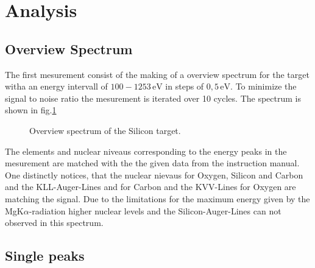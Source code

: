 \documentclass[numbers=noenddot,a4paper]{article}
\begin{document}
	\clearpage
	\section{Analysis}
	
	\subsection{Overview Spectrum}

The first mesurement consist of the making of a overview spectrum for the target witha an energy intervall of $100 - 1253\,\mathrm{eV}$ in steps of $0,5\,\mathrm{eV}$. To minimize the signal to noise ratio the mesurement is iterated over 10 cycles. The spectrum is shown in fig.\ref{fig:all}

				\begin{figure}[h]
					\centering
					\caption{Overview spectrum of the Silicon target.}\label{fig:all}
				\end{figure}
The elements and nuclear niveaus corresponding to the energy peaks in the mesurement are matched with the the given data from the instruction manual. One distinctly notices, that the nuclear nievaus for Oxygen, Silicon and Carbon and the KLL-Auger-Lines and for Carbon and the KVV-Lines for Oxygen are matching the signal. Due to the limitations for the maximum energy given by the MgK$\alpha$-radiation higher nuclear levels and the Silicon-Auger-Lines can not observed in this spectrum.\\

\subsection{Single peaks}
\end{document}
